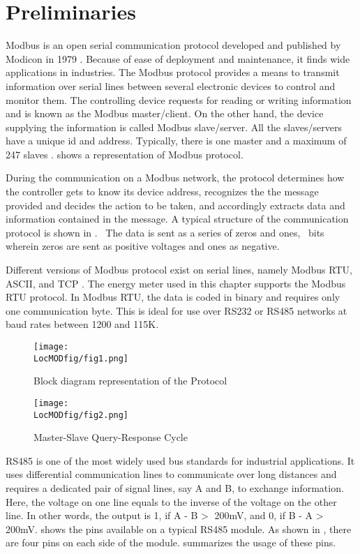 \section{Preliminaries}
Modbus is an open serial communication protocol developed and
published by Modicon in 1979 \cite{modbus} \cite{modbus-paper}. Because of ease of deployment and maintenance, it finds wide applications in industries. The Modbus protocol provides a means to transmit information over serial lines
between several electronic devices to control and monitor
them. The controlling device requests for reading or writing
information and is known as the Modbus master/client. On the other
hand, the device supplying the information is called
Modbus slave/server. All the slaves/servers have a unique id and
address. Typically, there is one master and a maximum of 247 slaves \cite{simplymodbus}.  shows a representation of Modbus protocol. 

During the communication on a Modbus network, the protocol determines
how the controller gets to know its device address, recognizes the
the message provided and decides the action to be taken, and accordingly
extracts data and information contained in the message. A typical structure of the communication protocol is shown in .  The data is
sent as a series of zeros and ones, \ie\ bits wherein zeros are sent
as positive voltages and ones as negative. 

Different versions of Modbus protocol exist on serial lines, namely
Modbus RTU, ASCII, and TCP \cite{simplymodbus}. 
The energy meter used in this chapter
supports the Modbus RTU protocol. In Modbus RTU, the data is coded in
binary and requires only one communication byte. This is ideal for use
over RS232 or RS485 networks at baud rates between 1200 and 115K.

\begin{figure}
  \centering
  \texttt{[image: \\LocMODfig/fig1.png]}
  \caption{Block diagram representation of the Protocol}
  \label{mod-block}
\end{figure}


\begin{figure}
  \centering
  \texttt{[image: \\LocMODfig/fig2.png]}
  \caption{Master-Slave Query-Response Cycle}
  \label{mod-master-slave}
\end{figure}

RS485 is one of the most widely used bus standards for industrial
applications. It uses differential communication lines to communicate
over long distances and requires a dedicated pair of signal lines, say
A and B, to exchange information. Here, the voltage on one line equals
to the inverse of the voltage on the other line. In other words, the
output is 1, if A - B \textgreater $\;$ 200mV, and 0, if B - A \textgreater $\;$
200mV.  shows the pins available on a typical RS485 module. As shown in , there are four pins on each side of the module.  summarizes the usage of these pins. 

